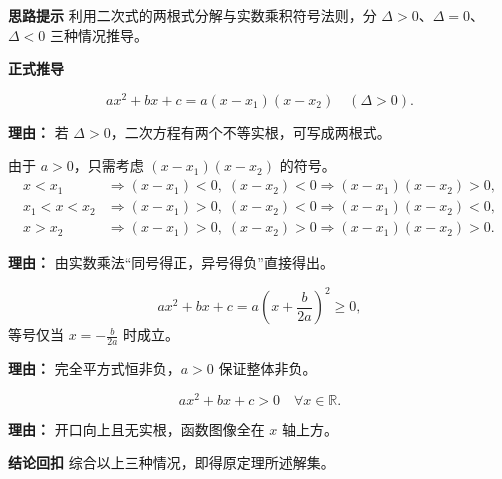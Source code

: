 \begin{proofbox}
	\textbf{\textcolor{CProof}{思路提示}}
	利用二次式的两根式分解与实数乘积符号法则，分 $\Delta>0$、$\Delta=0$、$\Delta<0$ 三种情况推导。

	\medskip
	\textbf{\textcolor{CProof}{正式推导}}
	\begin{description}[style=nextline, leftmargin=2.8em, labelsep=0.5em, itemsep=0.55em]
		\item[\textbf{步骤一（因式分解）：}]
			\[
				ax^2+bx+c = a(x-x_1)(x-x_2)\quad(\Delta>0).
			\]
			\par\textbf{理由：} 若 $\Delta>0$，二次方程有两个不等实根，可写成两根式。
		\item[\textbf{步骤二（符号分析）：}]
			由于 $a>0$，只需考虑 $(x-x_1)(x-x_2)$ 的符号。
			\[
				\begin{aligned}
					x<x_1 &\Rightarrow (x-x_1)<0,\;(x-x_2)<0 \Rightarrow (x-x_1)(x-x_2)>0,\\ x_1<x<x_2 &\Rightarrow (x-x_1)>0,\;(x-x_2)<0 \Rightarrow (x-x_1)(x-x_2)<0,\\ x>x_2 &\Rightarrow (x-x_1)>0,\;(x-x_2)>0 \Rightarrow (x-x_1)(x-x_2)>0.
			\end{aligned}
			\]
			\par\textbf{理由：} 由实数乘法“同号得正，异号得负”直接得出。
		\item[\textbf{步骤三（$\Delta=0$ 情形）：}]
			\[
				ax^2+bx+c = a\left(x+\frac{b}{2a}\right)^2 \ge 0,
			\]
			等号仅当 $x=-\frac{b}{2a}$ 时成立。
			\par\textbf{理由：} 完全平方式恒非负，$a>0$ 保证整体非负。
		\item[\textbf{步骤四（$\Delta<0$ 情形）：}]
			\[
				ax^2+bx+c > 0 \quad \forall x\in\mathbb{R}.
			\]
			\par\textbf{理由：} 开口向上且无实根，函数图像全在 $x$ 轴上方。
	\end{description}

	\medskip
	\textbf{\textcolor{CProof}{结论回扣}}
	综合以上三种情况，即得原定理所述解集。
\end{proofbox}
